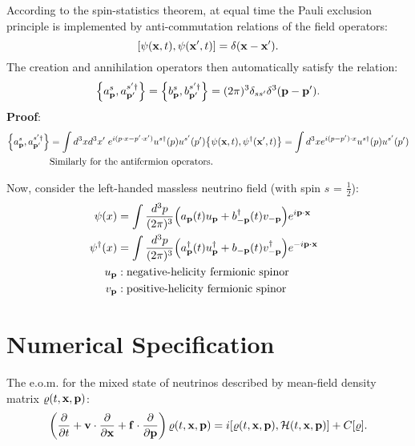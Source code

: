 \documentclass[11pt,a4paper]{article}
\begin{document}
    \noindent According to the spin-statistics theorem, at equal time the Pauli exclusion principle is implemented by anti-commutation relations of the field operators:
    \[
    \comm{\psi(\vb{x}, t)}{\psi(\vb{x}^{\prime}, t)} = \delta(\vb{x} - \vb{x}^{\prime}) .\] 
    \noindent The creation and annihilation operators then automatically satisfy the relation:
    \[
       \acomm{a_{\vb{p}}^{s}}{a_{\vb{p}^{\prime}}^{s^{\prime} \dagger}} = \acomm{b_{\vb{p}}^{s}}{b_{\vb{p}^{\prime}}^{s^{\prime}\dagger}} = (2\pi)^{3} \delta_{s s^{\prime}}\delta^{3}(\vb{p} - \vb{p}^{\prime}) 
 .\]
 \textbf{Proof}:
    \begin{align*}
       \acomm{a_{\vb{p}}^{s}}{a_{\vb{p}^{\prime}}^{s^{\prime} \dagger}} &= \int d^{3}x d^{3}x^{\prime} \hspace{0.1cm}e^{i(p \cdot x - p^{\prime}\cdot x^{\prime})} u^{s \dagger}(p) u^{s^{\prime}}(p^{\prime})\acomm{\psi (\vb{x}, t)}{\psi ^{\dagger}(\vb{x}^{\prime}, t)} = \int d^{3}x e^{i(p-p^{\prime}) \cdot x} u^{s \dagger}(p) u^{s^{\prime}}(p^{\prime}) \\
            &\text{Similarly for the antifermion operators.}
    \end{align*}

    \noindent Now, consider the left-handed massless neutrino field (with spin $s$ = $\frac{1}{2}$):
\begin{align*}
   \psi(x) &= \int \frac{d^{3}p}{(2\pi)^{3}}\Big(a_{\vb{p}}(t)u_{\vb{p}} + b^{\dagger}_{-\vb{p}}(t)v_{-\vb{p}}\Big)e^{i \vb{p} \cdot \vb{x}} \hspace{0.5cm}\\ 
   \psi ^{\dagger}(x) &= \int \frac{d^{3}p}{(2\pi)^{3}}\Big(a_{\vb{p}}^{\dagger}(t)u_{\vb{p}}^{\dagger} + b_{-\vb{p}}(t)v^{\dagger}_{-\vb{p}}\Big)e^{-i \vb{p} \cdot \vb{x}}\\
   u_{\vb{p}}&: \text{negative-helicity fermionic spinor}\\
   v_{\vb{p}}&: \text{positive-helicity fermionic spinor}
 \end{align*}


 \section{Numerical Specification}%
 \label{sec:Numerical Simulation}

 The e.o.m. for the mixed state of neutrinos described by mean-field density matrix $\varrho(t,\vb{x}, \vb{p})$:
 \[
 \left(  \frac{\partial}{\partial t} + \vb{v}\cdot \frac{\partial}{\partial \vb{x}} + \vb{f} \cdot \frac{\partial}{\partial \vb{p}}\right) \varrho(t,\vb{x}, \vb{p}) = i \comm{\varrho (t, \vb{x}, \vb{p})}{\mathcal{H}(t, \vb{x}, \vb{p})} + C[\varrho].\] 
\end{document}
